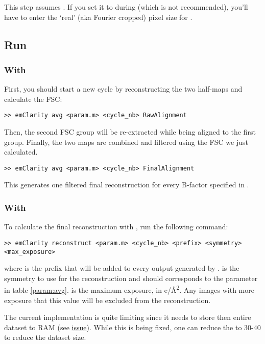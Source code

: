 \begin{note}This step assumes . If you set it to  during  (which is not recommended), you'll have to enter the `real' (aka Fourier cropped) pixel size for .\end{note}

\subsection{Run}

\subsubsection{With {\emClarity}}

First, you should start a new cycle by reconstructing the two half-maps and calculate the FSC:
\begin{lstlisting}
>> emClarity avg <param.m> <cycle_nb> RawAlignment
\end{lstlisting}
Then, the second FSC group will be re-extracted while being aligned to the first group. Finally, the two maps are combined and filtered using the FSC we just calculated.
\begin{lstlisting}
>> emClarity avg <param.m> <cycle_nb> FinalAlignment
\end{lstlisting}
This generates one filtered final reconstruction for every B-factor specified in .

\subsubsection{With {\cisTEM}}
To calculate the final reconstruction with {\cisTEM}, run the following command:
\begin{lstlisting}
>> emClarity reconstruct <param.m> <cycle_nb> <prefix> <symmetry> <max_exposure>
\end{lstlisting}
where  is the prefix that will be added to every output generated by {\cisTEM}.  is the symmetry to use for the reconstruction and should corresponds to the  parameter in table \ref{param:avg}.  is the maximum exposure, in e/\r{A}\textsuperscript{2}. Any images with more exposure that this value will be excluded from the reconstruction.

\begin{note}The current implementation is quite limiting since it needs to store then entire dataset to RAM (see \href{https://github.com/bHimes/emClarity/issues/139}{issue}). While this is being fixed, one can reduce the  to 30-40 to reduce the dataset size.\end{note}

